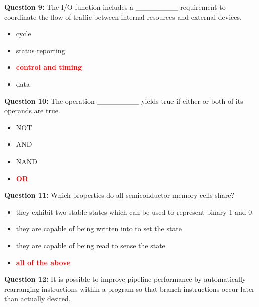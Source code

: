 \documentclass[12pt,a4paper]{article}
\begin{document}
\vspace{0.5cm}

\textbf{Question 9:} The I/O function includes a ________ requirement to coordinate the flow of traffic between internal resources and external devices.

\begin{itemize}
    \item[\textbf{A.}] cycle
    \item[\textbf{B.}] status reporting
    \item[\textbf{C.}] \textcolor{red}{\textbf{control and timing}}
    \item[\textbf{D.}] data
\end{itemize}

\vspace{0.5cm}

\textbf{Question 10:} The operation ________ yields true if either or both of its operands are true.

\begin{itemize}
    \item[\textbf{A.}] NOT
    \item[\textbf{B.}] AND
    \item[\textbf{C.}] NAND
    \item[\textbf{D.}] \textcolor{red}{\textbf{OR}}
\end{itemize}

\vspace{0.5cm}

\textbf{Question 11:} Which properties do all semiconductor memory cells share?

\begin{itemize}
    \item[\textbf{A.}] they exhibit two stable states which can be used to represent binary 1 and 0
    \item[\textbf{B.}] they are capable of being written into to set the state
    \item[\textbf{C.}] they are capable of being read to sense the state
    \item[\textbf{D.}] \textcolor{red}{\textbf{all of the above}}
\end{itemize}

\vspace{0.5cm}

\textbf{Question 12:} It is possible to improve pipeline performance by automatically rearranging instructions within a program so that branch instructions occur later than actually desired.
\end{document}
